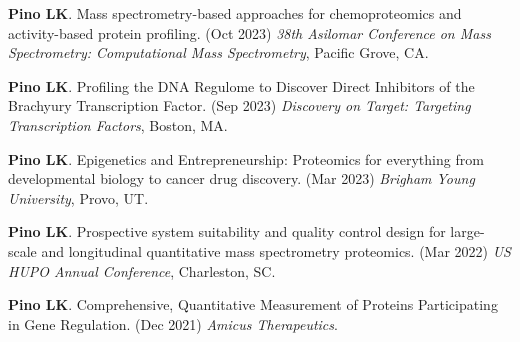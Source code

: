 \documentclass[11pt]{article}
\begin{document}
\begin{etaremune}
    \item \textbf{Pino LK}. Mass spectrometry-based approaches for chemoproteomics and activity-based protein profiling. (Oct 2023) \textit{38th Asilomar Conference on Mass Spectrometry: Computational Mass Spectrometry}, Pacific Grove, CA.

    \item \textbf{Pino LK}. Profiling the DNA Regulome to Discover Direct Inhibitors of the Brachyury Transcription Factor. (Sep 2023) \textit{Discovery on Target: Targeting Transcription Factors}, Boston, MA.



    \item \textbf{Pino LK}. Epigenetics and Entrepreneurship: Proteomics for everything from developmental biology to cancer drug discovery. (Mar 2023) \textit{Brigham Young University}, Provo, UT.

    \item \textbf{Pino LK}. Prospective system suitability and quality control design for
    large-scale and longitudinal quantitative mass spectrometry proteomics. (Mar 2022)
    \textit{US HUPO Annual Conference}, Charleston, SC.



    \item \textbf{Pino LK}. Comprehensive, Quantitative Measurement of Proteins Participating in Gene Regulation. (Dec 2021) \textit{Amicus Therapeutics}.



\end{etaremune}
\end{document}
